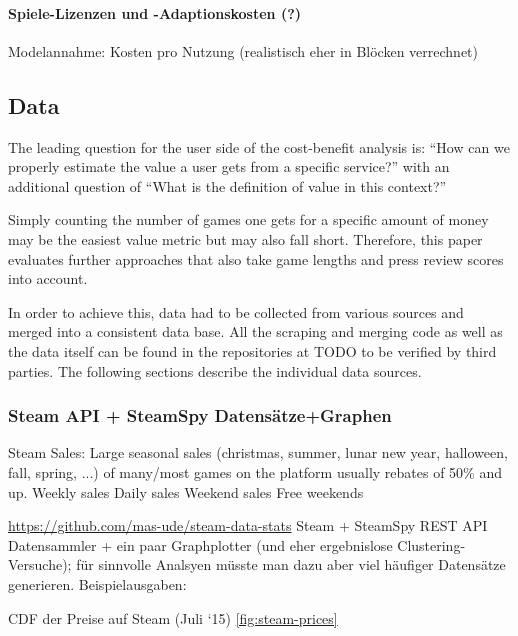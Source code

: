 \paragraph{Spiele-Lizenzen und -Adaptionskosten (?)}
Modelannahme: Kosten pro Nutzung (realistisch eher in Blöcken verrechnet)





\subsection{Data}

The leading question for the user side of the cost-benefit analysis is: ``How can we properly estimate the value a user gets from a specific service?'' with an additional question of ``What is the definition of value in this context?''

Simply counting the number of games one gets for a specific amount of money may be the easiest value metric but may also fall short. Therefore, this paper evaluates further approaches that also take game lengths and press review scores into account.

In order to achieve this, data had to be collected from various sources and merged into a consistent data base. All the scraping and merging code as well as the data itself can be found in the repositories at TODO to be verified by third parties. The following sections describe the individual data sources.

\subsubsection{Steam API + SteamSpy Datensätze+Graphen}

Steam Sales:
Large seasonal sales (christmas, summer, lunar new year, halloween, fall, spring, ...) of many/most games on the platform usually rebates of 50\% and up.
Weekly sales
Daily sales
Weekend sales
Free weekends



\url{https://github.com/mas-ude/steam-data-stats} Steam + SteamSpy REST API Datensammler + ein paar Graphplotter (und eher ergebnislose Clustering-Versuche); für sinnvolle Analsyen müsste man dazu aber viel häufiger Datensätze generieren. Beispielausgaben:

CDF der Preise auf Steam (Juli ‘15) \ref{fig:steam-prices}

